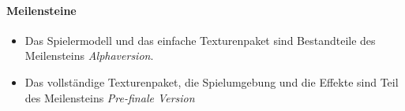 \paragraph{Meilensteine}\noindent
\begin{itemize}
\item Das Spielermodell und das einfache Texturenpaket sind Bestandteile des Meilensteins \textit{Alphaversion}.
\item Das vollständige Texturenpaket, die Spielumgebung und die Effekte sind Teil des Meilensteins \textit{Pre-finale Version}
\end{itemize}